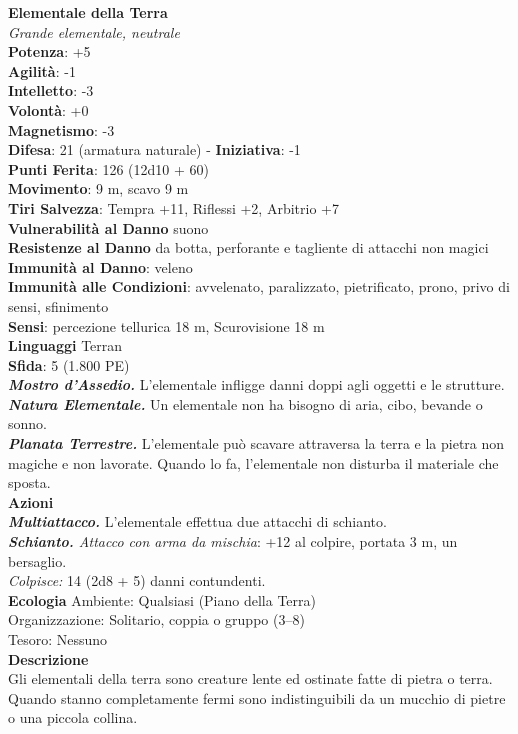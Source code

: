 \begin{multicols}{2}
\medskip\textbf{Elementale della Terra}\\
\emph{Grande elementale, neutrale}\\
\textbf{Potenza}: +5\\
\textbf{Agilità}: -1\\
\textbf{Intelletto}: -3\\
\textbf{Volontà}: +0\\
\textbf{Magnetismo}: -3\\
\textbf{Difesa}: 21 (armatura naturale) - \textbf{Iniziativa}: -1\\
\textbf{Punti Ferita}: 126 (12d10 + 60)\\
\textbf{Movimento}: 9 m, scavo 9 m\\
\textbf{Tiri Salvezza}: Tempra +11, Riflessi +2, Arbitrio +7\\
\textbf{Vulnerabilità al Danno} suono\\
\textbf{Resistenze al Danno} da botta, perforante e tagliente di attacchi non magici\\
\textbf{Immunità al Danno}: veleno\\
\textbf{Immunità alle Condizioni}: avvelenato, paralizzato, pietrificato, prono, privo di sensi, sfinimento\\
\textbf{Sensi}: percezione tellurica 18 m, Scurovisione 18 m\\
\textbf{Linguaggi} Terran\\
\textbf{Sfida}: 5 (1.800 PE)\smallskip\\
\emph{\textbf{Mostro d'Assedio.}} L'elementale infligge danni doppi agli oggetti e le strutture.\\
\emph{\textbf{Natura Elementale.}} Un elementale non ha bisogno di aria, cibo, bevande o sonno.\\
\emph{\textbf{Planata Terrestre.}} L'elementale può scavare attraversa la terra e la pietra non magiche e non lavorate. Quando lo fa, l'elementale non disturba il materiale che sposta.\\
\smallskip\textbf{Azioni}\\
\emph{\textbf{Multiattacco.}} L'elementale effettua due attacchi di schianto.\\
\emph{\textbf{Schianto.} Attacco con arma da mischia}: +12 al colpire, portata 3 m, un bersaglio.\\
\emph{Colpisce:} 14 (2d8 + 5) danni contundenti.\\
\textbf{Ecologia}
Ambiente: Qualsiasi (Piano della Terra)\\
Organizzazione: Solitario, coppia o gruppo (3–8)\\
Tesoro: Nessuno\\
\textbf{Descrizione}\\
Gli elementali della terra sono creature lente ed ostinate fatte di pietra o terra. Quando stanno completamente fermi sono indistinguibili da un mucchio di pietre o una piccola collina.\\


\end{multicols}
